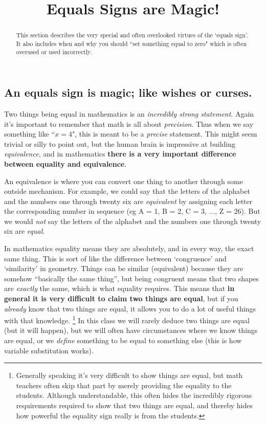 \documentclass{ximera}
\title{Equals Signs are Magic!}
\begin{document}
\begin{abstract}
    This section describes the very special and often overlooked virtues of the `equals sign'. It also includes when and why you should ``set something equal to zero" which is often overused or used incorrectly.
\end{abstract}
\maketitle

\subsection*{An equals sign is magic; like wishes or curses.}

    Two things being equal in mathematics is an \textit{incredibly strong statement}. Again it's important to remember that math is all about \textit{precision}. Thus when we say something like ``$x = 4$", this is meant to be a \textit{precise} statement. This might seem trivial or silly to point out, but the human brain is impressive at building \textit{equivalence}, and in mathematics \textbf{there is a very important difference between equality and equivalence}.
    
    An equivalence is where you can convert one thing to another through some outside mechanism. For example, we could say that the letters of the alphabet and the numbers one through twenty six are \textit{equivalent} by assigning each letter the corresponding number in sequence (eg A = 1, B = 2, C = 3, ..., Z = 26). But we would \textit{not} say the letters of the alphabet and the numbers one through twenty six are \textit{equal}.
    
    In mathematics equality means they are absolutely, and in every way, the exact same thing. This is sort of like the difference between `congruence' and `similarity' in geometry. Things can be similar (equivalent) because they are somehow ``basically the same thing'', but being congruent means that two shapes are \textit{exactly} the same, which is what equality requires. This means that \textbf{in general it is very difficult to claim two things are equal}, but if you \textit{already} know that two things are equal, it allows you to do a lot of useful things with that knowledge.%
    \footnote{%
        Generally speaking it's very difficult to show things are equal, but math teachers often skip that part by merely providing the equality to the students. Although understandable, this often hides the incredibly rigorous requirements required to show that two things are equal, and thereby hides how powerful the equality sign really is from the students.%
        }
    In this class we will rarely deduce two things are equal (but it will happen), but we will often have circumstances where we know things are equal, or we \textit{define} something to be equal to something else (this is how variable substitution works).
    
\end{document}
